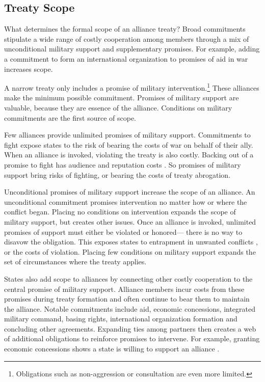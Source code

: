 \documentclass[12pt]{article}
\begin{document}
\subsection{Treaty Scope}


What determines the formal scope of an alliance treaty? 
Broad commitments stipulate a wide range of costly cooperation among members through a mix of unconditional military support and supplementary promises.
For example, adding a commitment to form an international organization to promises of aid in war increases scope.

A narrow treaty only includes a promise of military intervention.\footnote{Obligations such as non-aggression or consultation are even more limited.} 
These alliances make the minimum possible commitment. 
Promises of military support are valuable, because they are essence of the alliance.  
Conditions on military commitments are the first source of scope. 


Few alliances provide unlimited promises of military support. 
Commitments to fight expose states to the risk of bearing the costs of war on behalf of their ally. 
When an alliance is invoked, violating the treaty is also costly. 
Backing out of a promise to fight has audience \citep{Levyetal2015} and reputation costs \citep{Gibler2008, Crescenzietal2012, Mattes2012}. 
So promises of military support bring risks of fighting, or bearing the costs of treaty abrogation. 


Unconditional promises of military support increase the scope of an alliance. 
An unconditional commitment promises intervention no matter how or where the conflict began. 
Placing no conditions on intervention expands the scope of military support, but creates other issues. 
Once an alliance is invoked, unlimited promises of support must either be violated or honored--- there is no way to disavow the obligation. 
This exposes states to entrapment in unwanted conflicts \citep{Snyder1990, Benson2012}, or the costs of violation. 
Placing few conditions on military support expands the set of circumstances where the treaty applies.  


States also add scope to alliances by connecting other costly cooperation to the central promise of military support. 
Alliance members incur costs from these promises during treaty formation and often continue to bear them to maintain the alliance.
Notable commitments include aid, economic concessions, integrated military command, basing rights, international organization formation and concluding other agreements. 
Expanding ties among partners then creates a web of additional obligations to reinforce promises to intervene.  
For example, granting economic concessions shows a state is willing to support an alliance \citep{WolfordKim2017}. 
\end{document}
